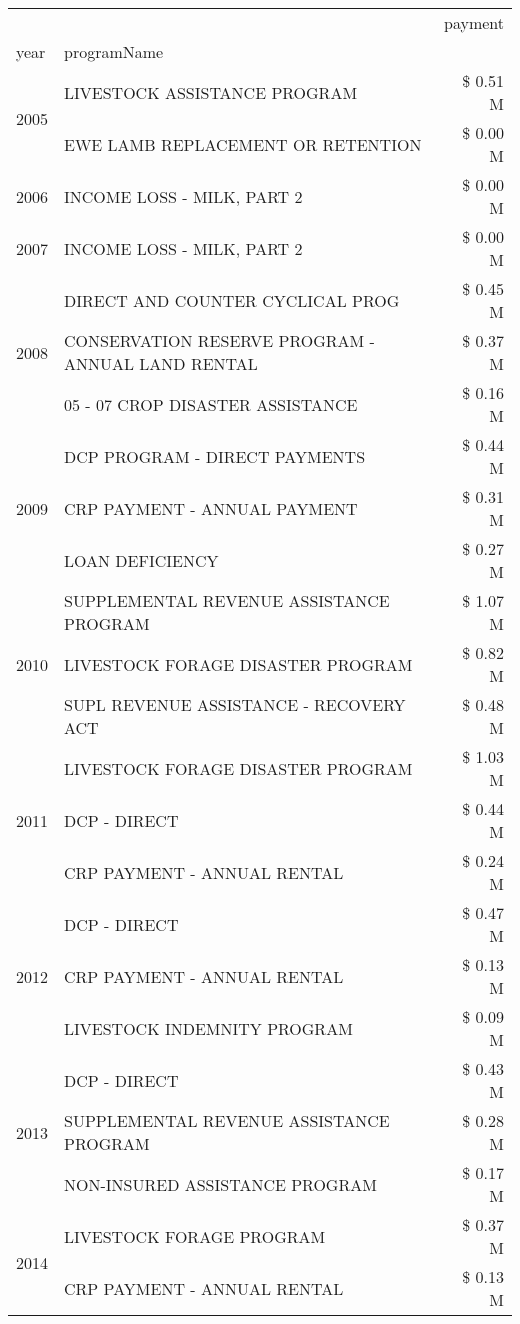 \begin{tabular}{llr}
\toprule
 &  & payment \\
year & programName &  \\
\midrule
\multirow[t]{2}{*}{2005} & LIVESTOCK ASSISTANCE PROGRAM & \$ 0.51 M \\
 & EWE LAMB REPLACEMENT OR RETENTION & \$ 0.00 M \\
\cline{1-3}
2006 & INCOME LOSS - MILK, PART 2 & \$ 0.00 M \\
\cline{1-3}
2007 & INCOME LOSS - MILK, PART 2 & \$ 0.00 M \\
\cline{1-3}
\multirow[t]{3}{*}{2008} & DIRECT AND COUNTER CYCLICAL PROG & \$ 0.45 M \\
 & CONSERVATION RESERVE PROGRAM - ANNUAL LAND RENTAL & \$ 0.37 M \\
 & 05 - 07 CROP DISASTER ASSISTANCE & \$ 0.16 M \\
\cline{1-3}
\multirow[t]{3}{*}{2009} & DCP PROGRAM - DIRECT PAYMENTS & \$ 0.44 M \\
 & CRP PAYMENT - ANNUAL PAYMENT & \$ 0.31 M \\
 & LOAN DEFICIENCY & \$ 0.27 M \\
\cline{1-3}
\multirow[t]{3}{*}{2010} & SUPPLEMENTAL REVENUE ASSISTANCE PROGRAM & \$ 1.07 M \\
 & LIVESTOCK FORAGE DISASTER PROGRAM & \$ 0.82 M \\
 & SUPL REVENUE ASSISTANCE - RECOVERY ACT & \$ 0.48 M \\
\cline{1-3}
\multirow[t]{3}{*}{2011} & LIVESTOCK FORAGE DISASTER PROGRAM & \$ 1.03 M \\
 & DCP - DIRECT & \$ 0.44 M \\
 & CRP PAYMENT - ANNUAL RENTAL & \$ 0.24 M \\
\cline{1-3}
\multirow[t]{3}{*}{2012} & DCP - DIRECT & \$ 0.47 M \\
 & CRP PAYMENT - ANNUAL RENTAL & \$ 0.13 M \\
 & LIVESTOCK INDEMNITY PROGRAM & \$ 0.09 M \\
\cline{1-3}
\multirow[t]{3}{*}{2013} & DCP - DIRECT & \$ 0.43 M \\
 & SUPPLEMENTAL REVENUE ASSISTANCE PROGRAM & \$ 0.28 M \\
 & NON-INSURED ASSISTANCE PROGRAM & \$ 0.17 M \\
\cline{1-3}
\multirow[t]{3}{*}{2014} & LIVESTOCK FORAGE PROGRAM & \$ 0.37 M \\
 & CRP PAYMENT - ANNUAL RENTAL & \$ 0.13 M \\

\end{tabular}
